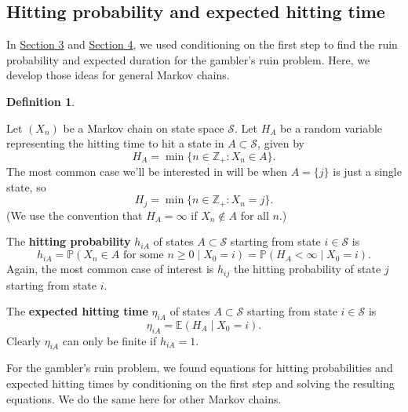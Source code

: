 \documentclass[
  a4paper,
]{article}
\theoremstyle{definition}
\newtheorem{definition}{Definition}[section]
\theoremstyle{definition}
\theoremstyle{definition}
\theoremstyle{remark}
\begin{document}
\hypertarget{hitting-definitions}{%
\subsection{Hitting probability and expected hitting time}\label{hitting-definitions}}

In \protect\hyperlink{S03-gamblers-ruin}{Section 3} and \protect\hyperlink{S04-ldes}{Section 4}, we used conditioning on the first step to find the ruin probability and expected duration for the gambler's ruin problem. Here, we develop those ideas for general Markov chains.

\begin{definition}
\protect\hypertarget{def:hitting-defs}{}\label{def:hitting-defs}

Let \((X_n)\) be a Markov chain on state space \(\mathcal S\). Let \(H_{A}\) be a random variable representing the hitting time to hit a state in \(A \subset \mathcal S\), given by
\[ H_{A} = \min \{n \in \mathbb Z_+ : X_n \in A  \} . \]
The most common case we'll be interested in will be when \(A = \{j\}\) is just a single state, so
\[ H_{j} = \min \{n \in \mathbb Z_+ : X_n = j  \} . \]
(We use the convention that \(H_A = \infty\) if \(X_n \not\in A\) for all \(n\).)

The \textbf{hitting probability} \(h_{iA}\) of states \(A \subset \mathcal S\) starting from state \(i \in \mathcal S\) is
\[ h_{iA} = \mathbb P(X_n \in A \text{ for some $n \geq 0$} \mid X_0 = i) = \mathbb P(H_A < \infty \mid X_0 = i) .  \]
Again, the most common case of interest is \(h_{ij}\) the hitting probability of state \(j\) starting from state \(i\).

The \textbf{expected hitting time} \(\eta_{iA}\) of states \(A \subset \mathcal S\) starting from state \(i \in \mathcal S\) is
\[ \eta_{iA} = \mathbb E(H_A \mid X_0 = i) .  \]
Clearly \(\eta_{iA}\) can only be finite if \(h_{iA} = 1\).

\end{definition}

For the gambler's ruin problem, we found equations for hitting probabilities and expected hitting times by conditioning on the first step and solving the resulting equations. We do the same here for other Markov chains.
\end{document}

